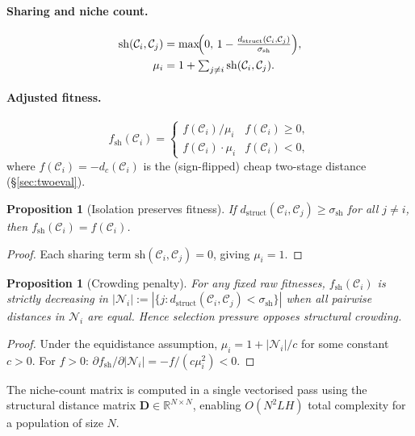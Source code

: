 \documentclass{article}
\newtheorem{proposition}[theorem]{Proposition}
\newcommand{\Cc}{\mathcal{C}}
\newcommand{\R}{\mathbb{R}}
\newcommand{\dstruct}{d_{\mathrm{struct}}}
\newcommand{\fsh}{f_{\mathrm{sh}}}
\begin{document}
\paragraph{Sharing and niche count.}
\begin{align}
  \mathrm{sh}(\Cc_i,\Cc_j)
    &= \max\!\Bigl(0,\, 1-\tfrac{\dstruct(\Cc_i,\Cc_j)}{\sigma_{\mathrm{sh}}}\Bigr),
  \label{eq:sh}\\
  \mu_i &= 1 + \textstyle\sum_{j\neq i}\mathrm{sh}(\Cc_i,\Cc_j).
  \label{eq:niche_count}
\end{align}

\paragraph{Adjusted fitness.}
\begin{equation}
  \fsh(\Cc_i)
  = \begin{cases}
      f(\Cc_i)/\mu_i & f(\Cc_i)\ge 0,\\
      f(\Cc_i)\cdot\mu_i & f(\Cc_i)<0,
    \end{cases}
  \label{eq:fsh}
\end{equation}
where $f(\Cc_i) = -d_c(\Cc_i)$ is the (sign-flipped) cheap
two-stage distance (\S\ref{sec:twoeval}).

\begin{proposition}[Isolation preserves fitness]
\label{prop:isolation}
If $\dstruct(\Cc_i,\Cc_j)\ge\sigma_{\mathrm{sh}}$ for all $j\neq i$,
then $\fsh(\Cc_i)=f(\Cc_i)$.
\end{proposition}
\begin{proof}
Each sharing term $\mathrm{sh}(\Cc_i,\Cc_j)=0$, giving $\mu_i=1$.
\end{proof}

\begin{proposition}[Crowding penalty]
\label{prop:crowding}
For any fixed raw fitnesses, $\fsh(\Cc_i)$ is strictly decreasing in
$|\mathcal{N}_i|:=|\{j:\dstruct(\Cc_i,\Cc_j)<\sigma_{\mathrm{sh}}\}|$
when all pairwise distances in $\mathcal{N}_i$ are equal.  Hence
selection pressure opposes structural crowding.
\end{proposition}
\begin{proof}
Under the equidistance assumption, $\mu_i=1+|\mathcal{N}_i|/c$ for
some constant $c>0$.  For $f>0$: $\partial\fsh/\partial|\mathcal{N}_i|
= -f/(c\mu_i^2)<0$.
\end{proof}

The niche-count matrix is computed in a single vectorised pass using
the structural distance matrix $\bm{D}\in\R^{N\times N}$,
enabling $O(N^2 LH)$ total complexity for a population of size $N$.
\end{document}
